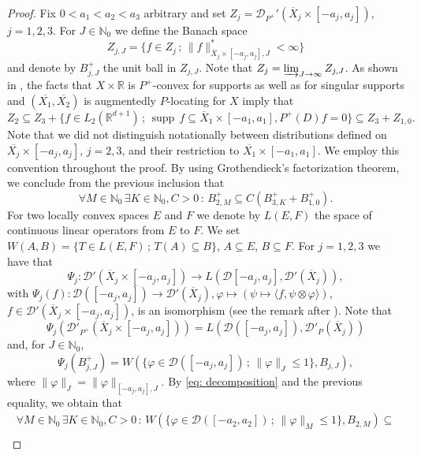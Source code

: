 \documentclass[12pt]{amsart}
\newcommand{\N}{\mathbb{N}}
\newcommand{\R}{\mathbb{R}}
\newcommand{\supp}{\operatorname{supp}\,}
\theoremstyle{definition}
\theoremstyle{remark}
\numberwithin{equation}{section}
\begin{document}
\begin{proof}
Fix  $0 < a_1 < a_2 < a_3$ arbitrary and set $Z_j =  \mathscr{D}_{P^+}'(\overline{X}_j\times[-a_j,a_j])$, $j=1,2,3$. For $J \in \N_0$ we define the Banach space 
\[ 
Z_{j,J} = \{ f  \in Z_j \,; \, \|f\|^*_{\overline{X}_j\times[-a_j,a_j], J} < \infty  \}
\]
and denote by $B_{j,J}^+$ the unit ball in $Z_{j,J}$. Note that $Z_j = \varinjlim_{J \to \infty} Z_{j,J}$. As shown in \cite[Section 3.4.5]{Wengenroth}, the facts that $X \times \R$ is $P^+$-convex for supports as well as for singular supports and $(\overline{X_1}, \overline{X_2})$ is augmentedly $P$-locating for $X$ imply that 
\[
	Z_2\subseteq Z_3+\{ f  \in L_2(\R^{d+1})\, ; \,\supp  f \subseteq\overline{X}_1\times[-a_1,a_1], P^+(D) f=0\}
		\subseteq Z_3+Z_{1,0}.
\]
Note that we did not distinguish notationally between distributions defined on $\overline{X_j}\times[-a_j,a_j]$, $j=2,3$, and their restriction to $\overline{X_1}\times[-a_1,a_1]$. We employ this convention throughout the proof. By using Grothendieck's factorization theorem, we conclude from the previous inclusion that 
	\begin{equation}\label{eq: decomposition}
	\forall M\in\N_0\, \exists K \in \N_0, C > 0 \,:\, B_{2,M}^+ \subseteq C(B_{3,K}^+ + B_{1,0}^+). 
 \end{equation}
	For two locally convex spaces $E$ and $F$ we denote by $L(E,F)$ the space of continuous linear operators from $E$ to $F$. We set  $W(A,B)=\{T\in L(E,F)\,; \,T(A)\subseteq B\}$, $A\subseteq E$, $B\subseteq F$. For $j  = 1,2,3$ we have that
	$$\Psi_j:\mathscr{D}'(\overline{X}_j\times[-a_j,a_j])\rightarrow L(\mathscr{D}[-a_j,a_j],\mathscr{D}'(\overline{X}_j)), $$
	with $\Psi_j(f):\mathscr{D}([-a_j,a_j])\rightarrow\mathscr{D}'(\overline{X}_j),\varphi\mapsto\left(\psi\mapsto \langle f,\psi\otimes\varphi \rangle\right)$, $f\in\mathscr{D}'(\overline{X}_j\times[-a_j,a_j])$, is an isomorphism (see the remark after \cite[Theorem 21.6.9]{Jarchow1981}). Note that 
\[
		\Psi_j\left(\mathscr{D}'_{P^+}(\overline{X}_j\times[-a_j,a_j])\right)=L\left(\mathscr{D}([-a_j,a_j]),\mathscr{D}'_P(\overline{X}_j)\right)
\]
	and, for $J \in \N_0$, 
$$
		\Psi_j\left(B_{j,J}^+\right)=W\left(\{\varphi\in\mathscr{D}([-a_j,a_j]) \,; \, \|\varphi\|_J\leq 1\},B_{j,J}\right),
$$
where $\|\varphi\|_J = \|\varphi\|_{[-a_j,a_j],J}$. By \eqref{eq: decomposition} and the previous equality, we obtain that 
	\begin{gather*}
		\forall M \in\N_0\, \exists K \in \N_0, C > 0 \,:\,
		W\left(\{\varphi\in\mathscr{D}([-a_{2},a_{2}])\, ; \,\|\varphi\|_{M}\leq 1\},B_{2,M}\right)\subseteq \\

\end{gather*}
\end{proof}
\end{document}

